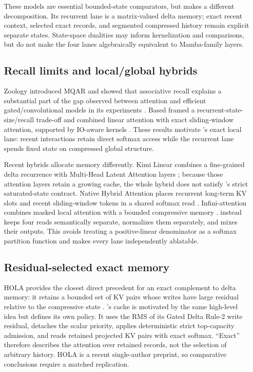 These models are essential bounded-state comparators, but \ALUCLU makes a
different decomposition. Its recurrent lane is a matrix-valued delta memory;
exact recent context, selected exact records, and segmented compressed history
remain explicit separate states. State-space dualities may inform
kernelization and comparisons, but do not make the four lanes algebraically
equivalent to Mamba-family layers.

\subsection{Recall limits and local/global hybrids}

Zoology introduced MQAR and showed that associative recall explains a
substantial part of the gap observed between attention and efficient
gated/convolutional models in its experiments \citep{arora2024zoology}. Based
framed a recurrent-state-size/recall trade-off and combined linear attention
with exact sliding-window attention, supported by IO-aware kernels
\citep{arora2024based}. These results motivate \ALUCLU's exact local lane:
recent interactions retain direct softmax access while the recurrent lane
spends fixed state on compressed global structure.

Recent hybrids allocate memory differently. Kimi Linear combines a
fine-grained delta recurrence with Multi-Head Latent Attention layers
\citep{kimiteam2025kimi}; because those attention layers retain a growing
cache, the whole hybrid does not satisfy \ALUCLU's strict saturated-state
contract. Native Hybrid Attention places recurrent long-term KV slots and
recent sliding-window tokens in a shared softmax read
\citep{du2026native}. Infini-attention combines masked local attention with a
bounded compressive memory \citep{munkhdalai2024infini}. \ALUCLU instead keeps
four reads semantically separate, normalizes them separately, and mixes their
outputs. This avoids treating a positive-linear denominator as a softmax
partition function and makes every lane independently ablatable.

\subsection{Residual-selected exact memory}

HOLA provides the closest direct precedent for an exact complement to delta
memory: it retains a bounded set of KV pairs whose writes have large residual
relative to the compressive state \citep{cui2026hippocampus}. \ALUCLU's cache
is motivated by the same high-level idea but defines its own policy. It uses
the RMS of its Gated Delta Rule-2 write residual, detaches the scalar priority,
applies deterministic strict top-capacity admission, and reads retained
projected KV pairs with exact softmax. ``Exact'' therefore describes the
attention over retained records, not the selection of arbitrary history. HOLA
is a recent single-author preprint, so comparative conclusions require a
matched replication.

